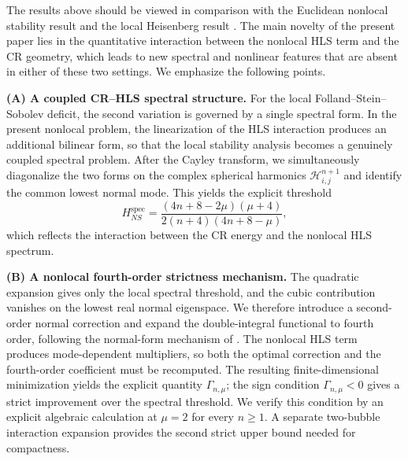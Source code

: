 \documentclass[10pt,a4paper]{amsart}
\begin{document}
The results above should be viewed in comparison with the Euclidean nonlocal stability result \cite{Z26} and the local Heisenberg result \cite{TZZ24}. The main novelty of the present paper lies in the quantitative interaction between the nonlocal HLS term and the CR geometry, which leads to new spectral and nonlinear features that are absent in either of these two settings. We emphasize the following points.

\vspace{.2cm}

{\bf (A) A coupled CR--HLS spectral structure.}
For the local Folland--Stein--Sobolev deficit, the second variation is governed by a single spectral form. In the present nonlocal problem, the linearization of the HLS interaction produces an additional bilinear form, so that the local stability analysis becomes a genuinely coupled spectral problem. After the Cayley transform, we simultaneously diagonalize the two forms on the complex spherical harmonics $\mathcal H_{i,j}^{n+1}$ and identify the common lowest normal mode. This yields the explicit threshold
\[
H_{NS}^{\mathrm{spec}}
=\frac{(4n+8-2\mu)(\mu+4)}
{2(n+4)(4n+8-\mu)},
\]
which reflects the interaction between the CR energy and the nonlocal HLS spectrum.

\vspace{.1cm}

{\bf (B) A nonlocal fourth-order strictness mechanism.}
\begingroup
The quadratic expansion gives only the local spectral threshold, and the cubic contribution vanishes on the lowest real normal eigenspace. We therefore introduce a second-order normal correction and expand the double-integral functional to fourth order, following the normal-form mechanism of \cite[Proposition~6.4]{Li26}. The nonlocal HLS term produces mode-dependent multipliers, so both the optimal correction and the fourth-order coefficient must be recomputed. The resulting finite-dimensional minimization yields the explicit quantity $\Gamma_{n,\mu}$; the sign condition $\Gamma_{n,\mu}<0$ gives a strict improvement over the spectral threshold. We verify this condition by an explicit algebraic calculation at $\mu=2$ for every $n\ge1$. A separate two-bubble interaction expansion provides the second strict upper bound needed for compactness.
\endgroup

\vspace{.1cm}
\end{document}
